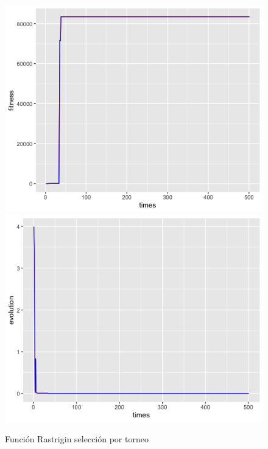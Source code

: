 \documentclass[letterpaper,12pt]{article}
\theoremstyle{definition}
\begin{document}
\begin{figure}[H]
    \includegraphics[width=\linewidth]{rast_tour_fitness}
  \endminipage\hfill
    \includegraphics[width=\linewidth]{rast_tour_eval}
  \endminipage\hfill
  \caption{Función Rastrigin selección por torneo}
  \label{fig:rast_tour}
\end{figure}
\end{document}
